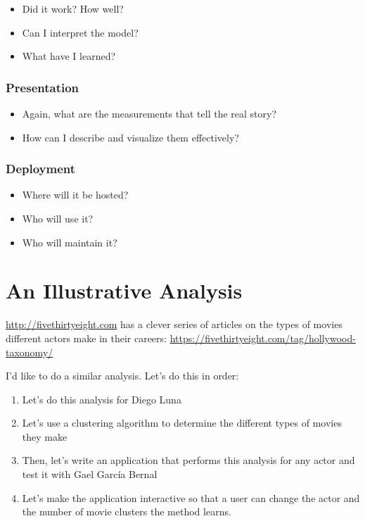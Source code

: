 \documentclass[]{article}
\theoremstyle{definition}
\theoremstyle{definition}
\theoremstyle{remark}
\begin{document}
\begin{itemize}
\itemsep1pt\parskip0pt
\item
  Did it work? How well?
\item
  Can I interpret the model?
\item
  What have I learned?
\end{itemize}

\subsubsection{Presentation}\label{presentation}

\begin{itemize}
\itemsep1pt\parskip0pt
\item
  Again, what are the measurements that tell the real story?
\item
  How can I describe and visualize them effectively?
\end{itemize}

\subsubsection{Deployment}\label{deployment}

\begin{itemize}
\itemsep1pt\parskip0pt
\item
  Where will it be hosted?
\item
  Who will use it?
\item
  Who will maintain it?
\end{itemize}

\section{An Illustrative Analysis}\label{an-illustrative-analysis}

\url{http://fivethirtyeight.com} has a clever series of articles on the
types of movies different actors make in their careers:
\url{https://fivethirtyeight.com/tag/hollywood-taxonomy/}

I'd like to do a similar analysis. Let's do this in order:

\begin{enumerate}
\def\labelenumi{\arabic{enumi})}
\itemsep1pt\parskip0pt
\item
  Let's do this analysis for Diego Luna
\item
  Let's use a clustering algorithm to determine the different types of
  movies they make
\item
  Then, let's write an application that performs this analysis for any
  actor and test it with Gael García Bernal
\item
  Let's make the application interactive so that a user can change the
  actor and the number of movie clusters the method learns.
\end{enumerate}
\end{document}
